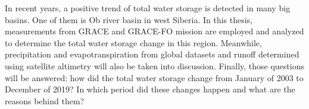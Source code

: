 In recent years, a positive trend of total water storage is detected in many big basins. One of them is Ob river basin in west Siberia. In this thesis, measurements from GRACE and GRACE-FO mission are employed and analyzed to determine the total water storage change in this region. Meanwhile, precipitation and evapotranspiration from global datasets and runoff determined using satellite altimetry will also be taken into discussion. Finally, those questions will be answered: how did the total water storage change from January of 2003 to December of 2019? In which period did these changes happen and what are the reasons behind them?